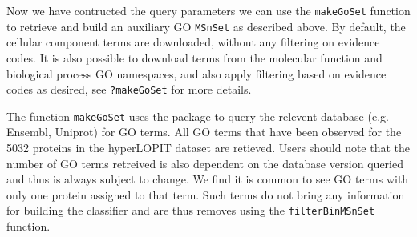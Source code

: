 \begin{knitrout}
\color{fgcolor}\begin{kframe}
\begin{alltt}
 \hlkwb{<-} \hlstd{(} \hlstd{=} \hlstd{(}\hlstd{,} \hlstd{))}
\end{alltt}
\end{kframe}
\end{knitrout}

Now we have contructed the query parameters we can use the
\texttt{makeGoSet} function to retrieve and build an auxiliary GO
\texttt{MSnSet} as described above. By default, the cellular component
terms are downloaded, without any filtering on evidence codes. It is
also possible to download terms from the molecular function and
biological process GO namespaces, and also apply filtering based on
evidence codes as desired, see \texttt{?makeGoSet} for more details.

\begin{knitrout}
\color{fgcolor}\begin{kframe}
\begin{alltt}
 \hlkwb{<-}     \hlstd{=} \hlstd{)}
\end{alltt}
\end{kframe}
\end{knitrout}

The function \texttt{makeGoSet} uses the  package to
query the relevent database (e.g. Ensembl, Uniprot) for GO terms. All
GO terms that have been observed for the 5032 proteins in the
hyperLOPIT dataset are retieved. Users should note that the number of
GO terms retreived is also dependent on the database version queried
and thus is always subject to change. We find it is common to see GO
terms with only one protein assigned to that term. Such terms do not
bring any information for building the classifier and are thus removes
using the \texttt{filterBinMSnSet} function.

\begin{knitrout}
\color{fgcolor}\begin{kframe}
\begin{alltt}
 \hlkwb{<-} 
\end{alltt}
\end{kframe}
\end{knitrout}

